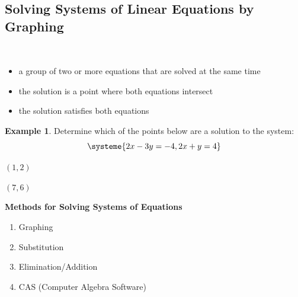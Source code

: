 \documentclass[addpoints,12pt]{exam}
\theoremstyle{definition}
\theoremstyle{break}
\theoremstyle{break}
\newtheorem{example}{Example}[subsection]
\begin{document}
\setcounter{section}{4}
\setcounter{subsection}{0}

\subsection{Solving Systems of Linear Equations by Graphing}

\vspace{.15in}

\begin{definition}
\mbox{}\\
\vspace{-.5in}
\begin{itemize}
\item a group of two or more equations that are solved at the same time
\item the solution is a point where both equations intersect
\item the solution satisfies both equations
\end{itemize}
\end{definition}

\vspace{.15in}

\begin{example}
Determine which of the points below are a solution to the system:
\[\systeme{2x-3y=-4,2x+y=4}\]

\begin{enumerate}
\begin{minipage}{.5\textwidth}
\item $(1,2)$
\end{minipage}%
\begin{minipage}{.5\textwidth}
\item $(7,6)$
\end{minipage}%
\end{enumerate}
\end{example}

\vspace{2in}

\begin{mdframed}
\textbf{Methods for Solving Systems of Equations}
\begin{enumerate}
\item Graphing
\item Substitution
\item Elimination/Addition
\item CAS (Computer Algebra Software)
\end{enumerate}
\end{mdframed}
\end{document}
